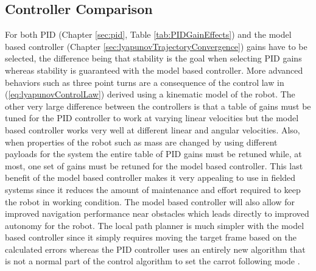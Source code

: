 \subsection{Controller Comparison}
\label{sec:controllerComparison}
For both PID (Chapter \ref{sec:pid}, Table \ref{tab:PIDGainEffects}) and the model based controller (Chapter \ref{sec:lyapunovTrajectoryConvergence}) gains have to be selected, the difference being that stability is the goal when selecting PID gains whereas stability is guaranteed with the model based controller. More advanced behaviors such as three point turns are a consequence of the control law in (\ref{eq:lyapunovControlLaw}) derived using a kinematic model of the robot. The other very large difference between the controllers is that a table of gains must be tuned for the PID controller to work at varying linear velocities but the model based controller works very well at different linear and angular velocities. Also, when properties of the robot such as mass are changed by using different payloads for the system the entire table of PID gains must be retuned while, at most, one set of gains must be retuned for the model based controller. This last benefit of the model based controller makes it very appealing to use in fielded systems since it reduces the amount of maintenance and effort required to keep the robot in working condition. The model based controller will also allow for improved navigation performance near obstacles which leads directly to improved autonomy for the robot. The local path planner is much simpler with the model based controller since it simply requires moving the target frame based on the calculated errors whereas the PID controller uses an entirely new algorithm that is not a normal part of the control algorithm to set the carrot following mode \cite{Hogg02}.

